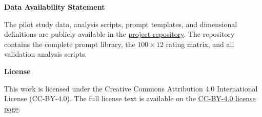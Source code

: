 \documentclass[11pt,a4paper]{article}
\newcommand{\backmatterlabel}[1]{%
  \par\smallskip
  \noindent\textbf{#1}\enspace
}
\begin{document}
\backmatterlabel{Data Availability Statement}

\noindent The pilot study data, analysis scripts, prompt templates, and dimensional definitions are publicly available in the \href{https://github.com/research-line/ai-elite-swr}{project repository}. The repository contains the complete prompt library, the $100 \times 12$ rating matrix, and all validation analysis scripts.


\backmatterlabel{License}

\noindent This work is licensed under the Creative Commons Attribution 4.0 International License (CC-BY-4.0). The full license text is available on the \href{https://creativecommons.org/licenses/by/4.0/}{CC-BY-4.0 license page}.
\endgroup


\newpage
\end{document}
